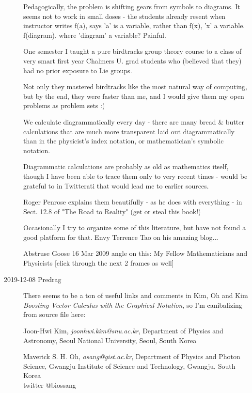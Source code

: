 \begin{description}
Pedagogically, the problem is shifting gears from symbols to diagrams. It seems not to work in small doses - the students already resent when instructor writes f(a), says 'a' is a variable, rather than f(x), 'x' a variable. f(diagram), where 'diagram' a variable?
Painful.

One semester I taught a pure birdtracks group theory course to a class of very smart first year Chalmers U. grad students who (believed that they) had no prior exposure to Lie groups.

Not only they mastered birdtracks like the most natural way of computing, but by the end, they were faster than me, and I would give them my open problems as problem sets :)

We calculate diagrammatically every day - there are many bread \& butter calculations that are much more transparent laid out diagrammatically than in the physicist's index notation, or mathematician's symbolic notation.

Diagrammatic calculations are probably as old as mathematics itself, though I have been able to trace them only to very recent times - would be grateful to in Twitterati that would lead me to earlier sources.

Roger Penrose explains them beautifully - as he does with everything - in Sect. 12.8 of "The Road to Reality" (get or steal this book!)

Occasionally I try to organize some of this literature, but have not found a good platform for that. Envy Terrence Tao on his amazing blog...

Abstruse Goose 16 Mar 2009 angle on this:
My Fellow Mathematicians and Physicists
    [click through the next 2 frames as well]

\item[2019-12-08 Predrag] There seems to be a ton of useful links and comments
in Kim, Oh and Kim
{\em Boosting Vector Calculus with the Graphical Notation},
so I'm canibalizing from  source file here:

{Joon-Hwi Kim},
{\em joonhwi.kim@snu.ac.kr},
{Department of Physics and Astronomy, Seoul National University, Seoul, South Korea}

{Maverick S. H. Oh},
{\em osang@gist.ac.kr},
{Department of Physics and Photon Science, Gwangju Institute of Science and Technology, Gwangju, South Korea}
\\
twitter @biossang


\end{description}
